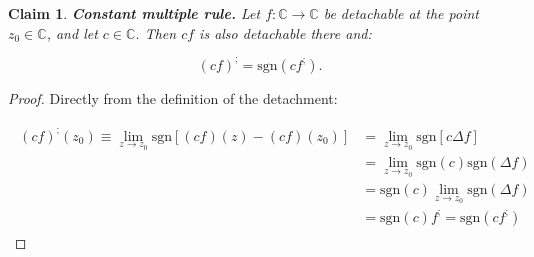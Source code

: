 \documentclass[11pt]{book}
\newtheorem{clm}[thm]{Claim}
\begin{document}
\begin{clm}\textbf{Constant multiple rule.} Let $f:\mathbb{C}\longrightarrow\mathbb{C}$ be detachable at the point $z_{0}\in\mathbb{C}$, and let $c\in\mathbb{C}$. Then $cf$ is also detachable there and:

$$\left(cf\right)^{;}=\text{sgn}\left(cf^{;}\right).$$
\label{complex_constant_multiple_rule}
\end{clm}
\begin{proof}Directly from the definition of the detachment:

\begin{align}
\begin{aligned}
\left(cf\right)^{;}\left(z_{0}\right) \equiv\underset{z\to z_{0}}{\lim}\text{sgn}\left[\left(cf\right)\left(z\right)-\left(cf\right)\left(z_{0}\right)\right]
&=\underset{z\to z_{0}}{\lim}\text{sgn}\left[c\Delta f\right] \\
&=\underset{z\to z_{0}}{\lim}\text{sgn}\left(c\right)\text{sgn}\left(\Delta f\right) \\
&=\text{sgn}\left(c\right)\underset{z\to z_{0}}{\lim}\text{sgn}\left(\Delta f\right) \\
&=\text{sgn}\left(c\right)f^{;}=\text{sgn}\left(cf^{;}\right)
\end{aligned}
\end{align}
\end{proof}
\end{document}
